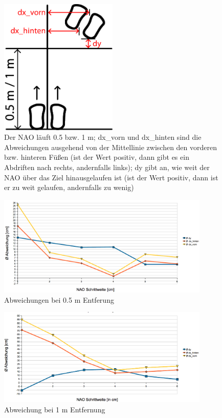 \begin{figure}[ht]
    \centering
  \includegraphics[width=0.5\textwidth, angle=0]{img/nao_4.png}
    \caption{Der NAO läuft 0.5 bzw. 1 m; dx\_vorn und dx\_hinten sind die Abweichungen ausgehend von der Mittellinie zwischen den vorderen bzw. hinteren Füßen (ist der Wert positiv, dann gibt es ein Abdriften nach rechts, andernfalls links); dy gibt an, wie weit der NAO über das Ziel hinausgelaufen ist (ist der Wert positiv, dann ist er zu weit gelaufen, andernfalls zu wenig)}
    \label{nao_foot}
\end{figure}

\begin{figure}[ht]
    \centering
  \includegraphics[width=0.9\textwidth, angle=0]{img/nao_5.png}
    \caption{Abweichungen bei 0.5 m Entferung}
    \label{naotab3}
\end{figure}

\begin{figure}[ht]
    \centering
  \includegraphics[width=0.9\textwidth, angle=0]{img/nao_6.png}
    \caption{Abweichung bei 1 m Entfernung}
    \label{naotab4}
\end{figure}

